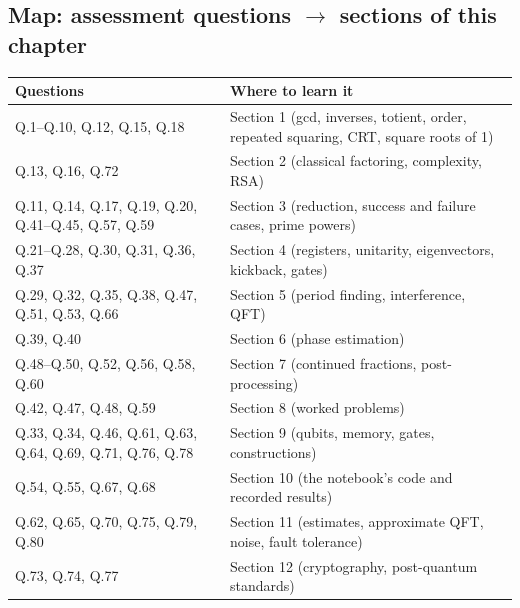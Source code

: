 \documentclass[11pt,a4paper,openany]{book}
\begin{document}
\subsection{Map: assessment questions $\to$ sections of this chapter}
\begin{tabularx}{\linewidth}{@{}lX@{}}
\toprule
\textbf{Questions} & \textbf{Where to learn it}\\ \midrule
Q.1--Q.10, Q.12, Q.15, Q.18 & Section 1 (gcd, inverses, totient, order, repeated squaring, CRT, square roots of 1)\\
Q.13, Q.16, Q.72 & Section 2 (classical factoring, complexity, RSA)\\
Q.11, Q.14, Q.17, Q.19, Q.20, Q.41--Q.45, Q.57, Q.59 & Section 3 (reduction, success and failure cases, prime powers)\\
Q.21--Q.28, Q.30, Q.31, Q.36, Q.37 & Section 4 (registers, unitarity, eigenvectors, kickback, gates)\\
Q.29, Q.32, Q.35, Q.38, Q.47, Q.51, Q.53, Q.66 & Section 5 (period finding, interference, QFT)\\
Q.39, Q.40 & Section 6 (phase estimation)\\
Q.48--Q.50, Q.52, Q.56, Q.58, Q.60 & Section 7 (continued fractions, post-processing)\\
Q.42, Q.47, Q.48, Q.59 & Section 8 (worked problems)\\
Q.33, Q.34, Q.46, Q.61, Q.63, Q.64, Q.69, Q.71, Q.76, Q.78 & Section 9 (qubits, memory, gates, constructions)\\
Q.54, Q.55, Q.67, Q.68 & Section 10 (the notebook's code and recorded results)\\
Q.62, Q.65, Q.70, Q.75, Q.79, Q.80 & Section 11 (estimates, approximate QFT, noise, fault tolerance)\\
Q.73, Q.74, Q.77 & Section 12 (cryptography, post-quantum standards)\\
\bottomrule
\end{tabularx}

\end{document}
